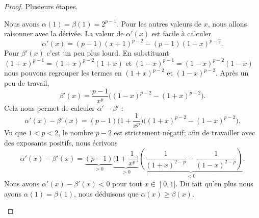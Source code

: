 \begin{proof}
	Plusieurs étapes.
	\begin{subproof}
		Nous avons \( \alpha(1)=\beta(1)=2^{p-1}\). Pour les autres valeurs de \( x\), nous allons raisonner avec la dérivée. La valeur de \( \alpha'(x)\) est facile à calculer
		\begin{equation}
			\alpha'(x)=(p-1)(x+1)^{p-2}-(p-1)(1-x)^{p-2}.
		\end{equation}
		Pour \( \beta'(x)\) c'est un peu plus lourd. En substituant \( (1+x)^{p-1}=(1+x)^{p-2}(1+x)\) et \( (1-x)^{p-1}=(1-x)^{p-2}(1-x)\) nous pouvons regrouper les termes en \( (1+x)^{p-2}\) et \( (1-x)^{p-2}\). Après un peu de travail,
		\begin{equation}
			\beta'(x)=\frac{ p-1 }{ x^p }\big( (1-x)^{p-2}-(1+x)^{p-2} \big).
		\end{equation}
		Cela nous permet de calculer \( \alpha'-\beta'\) :
		\begin{equation}
			\alpha'(x)-\beta'(x)=(p-1)\big( 1+\frac{1}{ x^p } \big)\big( (1+x)^{p-2}-(1-x)^{p-2} \big).
		\end{equation}
		Vu que \( 1<p<2\), le nombre \( p-2\) est strictement négatif; afin de travailler avec des exposants positifs, nous écrivons
		\begin{equation}
			\alpha'(x)-\beta'(x)=\underbrace{(p-1)}_{>0}\underbrace{\big( 1+\frac{1}{ x^p } \big)}_{>0}\underbrace{\left( \frac{1}{ (1+x)^{2-p}}-\frac{1}{ (1-x)^{2-p} }  \right)}_{<0}.
		\end{equation}
		Nous avons \( \alpha'(x)-\beta'(x)<0\) pour tout \( x\in \mathopen] 0 , 1 \mathclose]\). Du fait qu'en plus nous ayons \( \alpha(1)=\beta(1)\), nous déduisons que \( \alpha(x)\geq \beta(x)\).


\end{subproof}
\end{proof}
